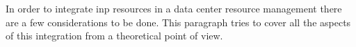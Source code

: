 In order to integrate \gls{inp} resources in a data center resource management there are a few considerations to be done.
This paragraph tries to cover all the aspects of this integration from a theoretical point of view.